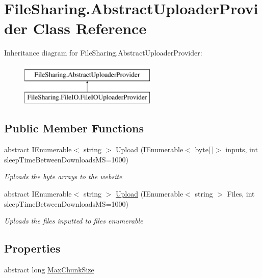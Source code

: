 \hypertarget{class_file_sharing_1_1_abstract_uploader_provider}{}\section{File\+Sharing.\+Abstract\+Uploader\+Provider Class Reference}
\label{class_file_sharing_1_1_abstract_uploader_provider}
Inheritance diagram for File\+Sharing.\+Abstract\+Uploader\+Provider\+:\begin{figure}[H]
\begin{center}
\leavevmode
\includegraphics[height=2.000000cm]{class_file_sharing_1_1_abstract_uploader_provider}
\end{center}
\end{figure}
\subsection*{Public Member Functions}
\begin{DoxyCompactItemize}
\item 
abstract I\+Enumerable$<$ string $>$ \hyperlink{class_file_sharing_1_1_abstract_uploader_provider_a951930bd16d0cfd061fa2dfd055e2601}{Upload} (I\+Enumerable$<$ byte\mbox{[}$\,$\mbox{]}$>$ inputs, int sleep\+Time\+Between\+Downloads\+MS=1000)
\begin{DoxyCompactList}\small\item\em Uploads the byte arrays to the website \end{DoxyCompactList}\item 
abstract I\+Enumerable$<$ string $>$ \hyperlink{class_file_sharing_1_1_abstract_uploader_provider_a7f85a810557b4bd71443eb2008547647}{Upload} (I\+Enumerable$<$ string $>$ Files, int sleep\+Time\+Between\+Downloads\+MS=1000)
\begin{DoxyCompactList}\small\item\em Uploads the files inputted to files enumerable \end{DoxyCompactList}\end{DoxyCompactItemize}
\subsection*{Properties}
\begin{DoxyCompactItemize}
\item 
abstract long \hyperlink{class_file_sharing_1_1_abstract_uploader_provider_abb54ae14105fa9e2d8e68ae474bd74cf}{Max\+Chunk\+Size}
\end{DoxyCompactItemize}


